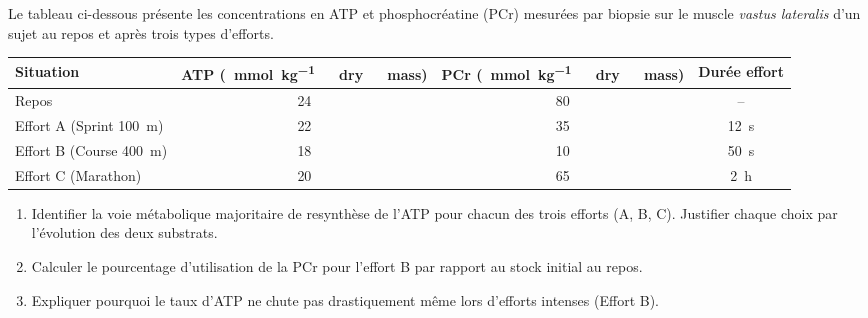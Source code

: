 \documentclass[11pt]{article}
\begin{document}
\begin{exercice}
Le tableau ci-dessous présente les concentrations en ATP et phosphocréatine (PCr) mesurées par biopsie sur le muscle \textit{vastus lateralis} d'un sujet au repos et après trois types d'efforts.

\begin{center}
\begin{tabular}{|l|c|c|c|}
\hline
\textbf{Situation} & \textbf{ATP (\SI{}{\milli\mol\per\kilo\gram\ dry\ mass})} & \textbf{PCr (\SI{}{\milli\mol\per\kilo\gram\ dry\ mass})} & \textbf{Durée effort} \\
\hline
Repos & 24 & 80 & -- \\
\hline
Effort A (Sprint \SI{100}{\meter}) & 22 & 35 & \SI{12}{\second} \\
\hline
Effort B (Course \SI{400}{\meter}) & 18 & 10 & \SI{50}{\second} \\
\hline
Effort C (Marathon) & 20 & 65 & \SI{2}{\hour} \\
\hline
\end{tabular}
\end{center}

\begin{enumerate}
    \item Identifier la voie métabolique majoritaire de resynthèse de l'ATP pour chacun des trois efforts (A, B, C). Justifier chaque choix par l'évolution des deux substrats.
    \item Calculer le pourcentage d'utilisation de la PCr pour l'effort B par rapport au stock initial au repos.
    \item Expliquer pourquoi le taux d'ATP ne chute pas drastiquement même lors d'efforts intenses (Effort B).
\end{enumerate}
\end{exercice}
\end{document}
